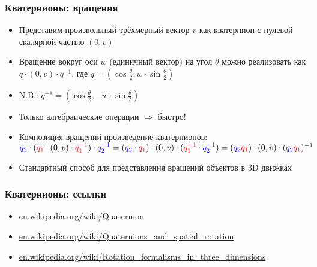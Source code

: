 \documentclass{beamer}
\begin{document}
\begin{frame}[fragile]
\frametitle{Кватернионы: вращения}
\begin{itemize}
\item Представим произвольный трёхмерный вектор \begin{math}v\end{math} как кватернион с нулевой скалярной частью \begin{math}(0, v)\end{math}
\item Вращение вокруг оси \begin{math}w\end{math} (единичный вектор) на угол \begin{math}\theta\end{math} можно реализовать как \begin{math}q \cdot (0, v) \cdot q^{-1}\end{math}, где \begin{math}q = (\cos \frac{\theta}{2}, w \cdot \sin \frac{\theta}{2})\end{math}
\pause
\item N.B.: \begin{math}q^{-1} = (\cos \frac{\theta}{2}, - w \cdot \sin \frac{\theta}{2})\end{math}
\pause
\item Только алгебраические операции \begin{math}\Rightarrow\end{math} быстро!
\pause
\item Композиция вращений \textendash{} произведение кватернионов: \begin{math}{\color{blue}q_2} \cdot ({\color{red}q_1} \cdot (0, v) \cdot {\color{red}q_1^{-1}}) \cdot {\color{blue}q_2^{-1}} = ({\color{blue}q_2} \cdot {\color{red}q_1}) \cdot (0, v) \cdot ({\color{red}q_1^{-1}} \cdot {\color{blue}q_2^{-1}}) = ({\color{blue}q_2}{\color{red}q_1}) \cdot (0, v) \cdot ({\color{blue}q_2}{\color{red}q_1})^{-1}\end{math}
\pause
\item Стандартный способ для представления вращений объектов в 3D движках
\end{itemize}
\end{frame}

\begin{frame}[fragile]
\frametitle{Кватернионы: ссылки}
\begin{itemize}
\item \href{https://en.wikipedia.org/wiki/Quaternion}{en.wikipedia.org/wiki/Quaternion}
\item \href{https://en.wikipedia.org/wiki/Quaternions_and_spatial_rotation}{en.wikipedia.org/wiki/Quaternions\_and\_spatial\_rotation}
\item \href{https://en.wikipedia.org/wiki/Rotation_formalisms_in_three_dimensions}{en.wikipedia.org/wiki/Rotation\_formalisms\_in\_three\_dimensions}
\end{itemize}
\end{frame}
\end{document}
